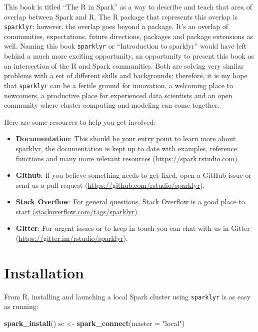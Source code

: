 \documentclass[]{book}
\newenvironment{Shaded}{\begin{snugshade}}{\end{snugshade}}
\newcommand{\DataTypeTok}[1]{\textcolor[rgb]{0.13,0.29,0.53}{#1}}
\newcommand{\KeywordTok}[1]{\textcolor[rgb]{0.13,0.29,0.53}{\textbf{#1}}}
\newcommand{\NormalTok}[1]{#1}
\newcommand{\StringTok}[1]{\textcolor[rgb]{0.31,0.60,0.02}{#1}}
\providecommand{\tightlist}{%
  \setlength{\itemsep}{0pt}\setlength{\parskip}{0pt}}
\theoremstyle{definition}
\theoremstyle{definition}
\theoremstyle{definition}
\theoremstyle{remark}
\begin{document}
This book is titled ``The R in Spark'' as a way to describe and teach
that area of overlap between Spark and R. The R package that represents
this overlap is \texttt{sparklyr}; however, the overlap goes beyond a
package. It's an overlap of communities, expectations, future
directions, packages and package extensions as well. Naming this book
\texttt{sparklyr} or ``Introduction to sparklyr'' would have left behind
a much more exciting opportunity, an opportunity to present this book as
an intersection of the R and Spark communities. Both are solving very
similar problems with a set of different skills and backgrounds;
therefore, it is my hope that \texttt{sparklyr} can be a fertile ground
for innovation, a welcoming place to newcomers, a productive place for
experienced data scientists and an open community where cluster
computing and modeling can come together.

Here are some resources to help you get involved:

\begin{itemize}
\tightlist
\item
  \textbf{Documentation}: This should be your entry point to learn more
  about sparklyr, the documentation is kept up to date with examples,
  reference functions and many more relevant resources
  (\url{https://spark.rstudio.com}).
\item
  \textbf{Github}: If you believe something needs to get fixed, open a
  GitHub issue or send us a pull request
  (\url{https://github.com/rstudio/sparklyr}).
\item
  \textbf{Stack Overflow}: For general questions, Stack Overflow is a
  good place to start (\url{stackoverflow.com/tags/sparklyr}).
\item
  \textbf{Gitter}: For urgent issues or to keep in touch you can chat
  with us in Gitter (\url{https://gitter.im/rstudio/sparklyr}).
\end{itemize}

\hypertarget{installation}{%
\chapter{Installation}\label{installation}}

From R, installing and launching a local Spark cluster using
\texttt{sparklyr} is as easy as running:

\begin{Shaded}
\begin{Highlighting}[]
\KeywordTok{spark_install}\NormalTok{()}
\NormalTok{sc <-}\StringTok{ }\KeywordTok{spark_connect}\NormalTok{(}\DataTypeTok{master =} \StringTok{"local"}\NormalTok{)}
\end{Highlighting}
\end{Shaded}
\end{document}
